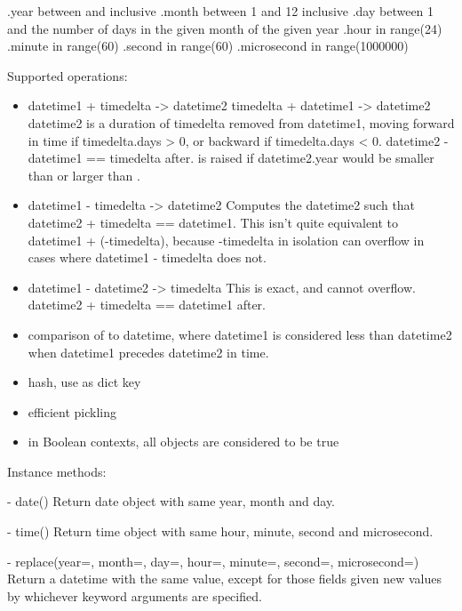     .year           between  and  inclusive
    .month          between 1 and 12 inclusive
    .day            between 1 and the number of days in the given month
                    of the given year
    .hour           in range(24)
    .minute         in range(60)
    .second         in range(60)
    .microsecond    in range(1000000)

Supported operations:

\begin{itemize}
  \item
    datetime1 + timedelta -> datetime2
    timedelta + datetime1 -> datetime2
    datetime2 is a duration of timedelta removed from datetime1, moving
    forward in time if timedelta.days > 0, or backward if
    timedelta.days < 0.  datetime2 - datetime1 == timedelta after.
     is raised if datetime2.year would be
    smaller than  or larger than .

  \item
    datetime1 - timedelta -> datetime2
    Computes the datetime2 such that datetime2 + timedelta == datetime1.
    This isn't quite equivalent to datetime1 + (-timedelta), because
    -timedelta in isolation can overflow in cases where
    datetime1 - timedelta does not.

  \item
    datetime1 - datetime2 -> timedelta
    This is exact, and cannot overflow.
    datetime2 + timedelta == datetime1 after.

  \item
    comparison of  to datetime, where datetime1 is
    considered less than datetime2 when datetime1 precedes datetime2
    in time.

  \item
    hash, use as dict key

  \item
    efficient pickling

  \item
    in Boolean contexts, all  objects are considered
    to be true
\end{itemize}

Instance methods:

  - date()
    Return date object with same year, month and day.

  - time()
    Return time object with same hour, minute, second and microsecond.

  - replace(year=, month=, day=, hour=, minute=, second=, microsecond=)
    Return a datetime with the same value, except for those fields given
    new values by whichever keyword arguments are specified.


